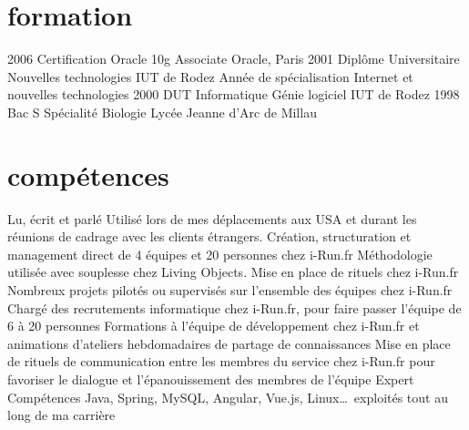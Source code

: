 \documentclass{friggeri-cv} 	%
\begin{document}

\section{formation}

\begin{entrylist}
\entry
{2006}
{Certification Oracle {\normalfont 10g Associate}}
{Oracle, Paris}
{}
\entry
{2001}
{Diplôme Universitaire {\normalfont Nouvelles technologies}}
{IUT de Rodez}
{Année de spécialisation Internet et nouvelles technologies}
\entry
{2000}
{DUT {\normalfont Informatique Génie logiciel}}
{IUT de Rodez}
{}
\entry
{1998}
{Bac S {\normalfont Spécialité Biologie}}
{Lycée Jeanne d’Arc de Millau}
{}
\end{entrylist}


\section{compétences}

\begin{capabilitize}
		{Lu, écrit et parlé}
		{Utilisé lors de mes déplacements aux USA et durant les réunions de cadrage avec les clients
		étrangers.}
		{}
		{Création, structuration et management direct de 4 équipes et 20 personnes chez i-Run.fr}
		{}
		{Méthodologie utilisée avec souplesse chez Living Objects. Mise en place de rituels chez i-Run.fr}
		{}
		{Nombreux projets pilotés ou supervisés sur l’ensemble des équipes chez i-Run.fr}
		{}
		{Chargé des recrutements informatique chez i-Run.fr, pour faire passer l’équipe de 6 à 20 personnes}
        {}
        {Formations à l’équipe de développement chez i-Run.fr et animations d’ateliers hebdomadaires de partage de connaissances}
		{}
		{Mise en place de rituels de communication entre les membres du service chez i-Run.fr pour favoriser le dialogue 
        et l’épanouissement des membres de l’équipe}
		{Expert}
		{Compétences Java, Spring, MySQL, Angular, Vue.js, Linux\dots\ exploités tout au long de ma carrière}
\end{capabilitize}
\end{document}
